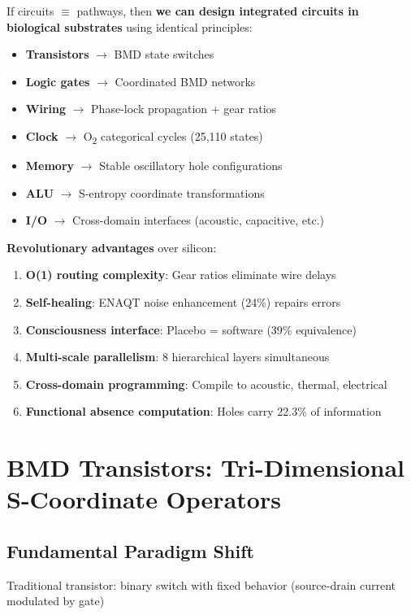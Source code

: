 \documentclass[11pt,a4paper]{article}
\begin{document}
If circuits $\equiv$ pathways, then \textbf{we can design integrated circuits in biological substrates} using identical principles:

\begin{itemize}
\item \textbf{Transistors} $\rightarrow$ BMD state switches
\item \textbf{Logic gates} $\rightarrow$ Coordinated BMD networks
\item \textbf{Wiring} $\rightarrow$ Phase-lock propagation + gear ratios
\item \textbf{Clock} $\rightarrow$ O\textsubscript{2} categorical cycles (25,110 states)
\item \textbf{Memory} $\rightarrow$ Stable oscillatory hole configurations
\item \textbf{ALU} $\rightarrow$ S-entropy coordinate transformations
\item \textbf{I/O} $\rightarrow$ Cross-domain interfaces (acoustic, capacitive, etc.)
\end{itemize}

\textbf{Revolutionary advantages} over silicon:
\begin{enumerate}
\item \textbf{O(1) routing complexity}: Gear ratios eliminate wire delays
\item \textbf{Self-healing}: ENAQT noise enhancement (24\%) repairs errors
\item \textbf{Consciousness interface}: Placebo = software (39\% equivalence)
\item \textbf{Multi-scale parallelism}: 8 hierarchical layers simultaneous
\item \textbf{Cross-domain programming}: Compile to acoustic, thermal, electrical
\item \textbf{Functional absence computation}: Holes carry 22.3\% of information
\end{enumerate}

\section{BMD Transistors: Tri-Dimensional S-Coordinate Operators}

\subsection{Fundamental Paradigm Shift}

Traditional transistor: binary switch with fixed behavior (source-drain current modulated by gate)
\end{document}
